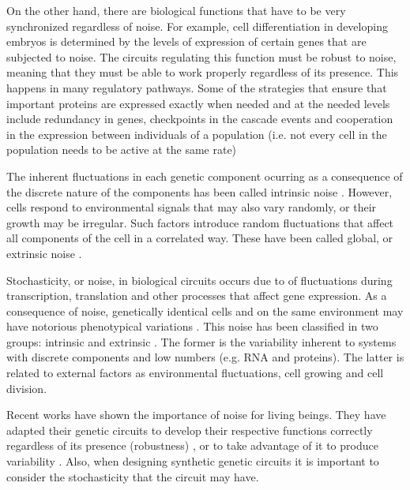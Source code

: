 
On the other hand, there are biological functions that have to be very synchronized regardless of noise. For example, cell differentiation in developing embryos is determined by the levels of expression of certain genes that are subjected to noise. The circuits regulating this function must be robust to noise, meaning that they must be able to work properly regardless of its presence. This happens in many regulatory pathways. Some of the strategies that ensure that important proteins are expressed exactly when needed and at the needed levels include redundancy in genes, checkpoints in the cascade events and cooperation in the expression between individuals of a population (i.e. not every cell in the population needs to be active at the same rate) \cite{mcadams99}


The inherent fluctuations in each genetic component ocurring as a consequence of the discrete nature of the components has been called intrinsic noise \cite{elowitz02}. However, cells respond to environmental signals that may also vary randomly, or their growth may be irregular. Such factors introduce random fluctuations that affect all components of the cell in a correlated way. These have been called global, or extrinsic noise \cite{elowitz02} \cite{pedraza05}. 

Stochasticity, or noise, in biological circuits occurs due to of fluctuations during transcription, translation \cite{kaern05} and other processes that affect gene expression. As a consequence of noise, genetically identical cells and on the same environment may have notorious phenotypical variations \cite{kaern05} \cite{elowitz02} \cite{pedraza05}. This noise has been classified in two groups: intrinsic and extrinsic \cite{elowitz02} \cite{paulsson05}. The former is the variability inherent to systems with discrete components and low numbers (e.g. RNA and proteins). The latter is related to external factors as environmental fluctuations, cell growing and cell division.

Recent works have shown the importance of noise for living beings. They have adapted their genetic circuits to develop their respective functions correctly regardless of its presence (robustness) \cite{alon99}, or to take advantage of it to produce variability \cite{arkin98}. Also, when designing synthetic genetic circuits it is important to consider the stochasticity that the circuit may have.

